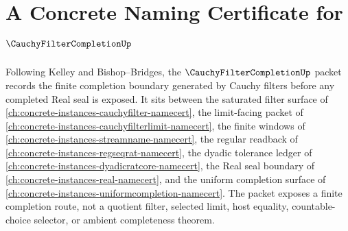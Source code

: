 \chapter{A Concrete Naming Certificate for $\CauchyFilterCompletionUp$}
\label{ch:concrete-instances-cauchyfiltercompletion-namecert}

Following Kelley and Bishop--Bridges, the $\CauchyFilterCompletionUp$ packet records the finite completion boundary generated by Cauchy filters before any completed Real seal is exposed. It sits between the saturated filter surface of \autoref{ch:concrete-instances-cauchyfilter-namecert}, the limit-facing packet of \autoref{ch:concrete-instances-cauchyfilterlimit-namecert}, the finite windows of \autoref{ch:concrete-instances-streamname-namecert}, the regular readback of \autoref{ch:concrete-instances-regseqrat-namecert}, the dyadic tolerance ledger of \autoref{ch:concrete-instances-dyadicratcore-namecert}, the Real seal boundary of \autoref{ch:concrete-instances-real-namecert}, and the uniform completion surface of \autoref{ch:concrete-instances-uniformcompletion-namecert}. The packet exposes a finite completion route, not a quotient filter, selected limit, host equality, countable-choice selector, or ambient completeness theorem.

